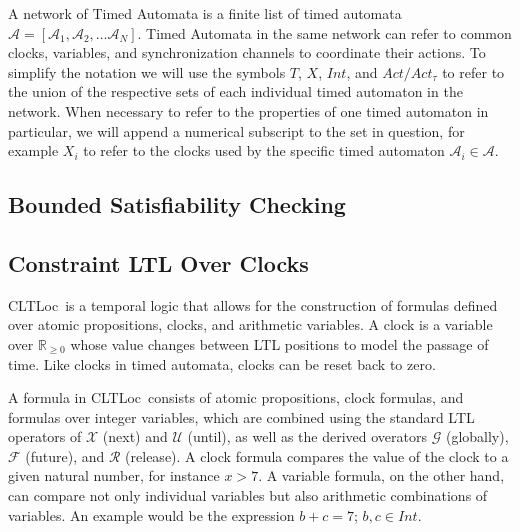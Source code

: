 \documentclass[a4paper,12pt]{article}
\newcommand{\cltloc}{CLTLoc}
\begin{document}
A network of Timed Automata is a finite list of timed automata \(\mathcal{A} =
[\mathcal{A}_1, \mathcal{A}_2, \ldots \mathcal{A}_N]\). Timed Automata in the
same network can refer to common clocks, variables, and synchronization channels
to coordinate their actions. To simplify the notation we will use the symbols
\(T\), \(X\), \(Int\), and \(Act/Act_{\tau}\) to refer to the union of the respective
sets of each individual timed automaton in the network. When necessary to refer
to the properties of one timed automaton in particular, we will append a
numerical subscript to the set in question, for example \(X_i\) to refer to the
clocks used by the specific timed automaton \(\mathcal{A}_{i} \in \mathcal{A}\).

\subsection{Bounded Satisfiability Checking}\label{bounded-sat}


\subsection{Constraint LTL Over Clocks}\label{cltloc}

\cltloc\ is a temporal logic that allows for the construction of formulas
defined over atomic propositions, clocks, and arithmetic variables. A clock is a
variable over \(\mathbb{R}_{\geq 0}\) whose value changes between LTL positions
to model the passage of time. Like clocks in timed automata, clocks can be
reset back to zero.

A formula in \cltloc\ consists of atomic propositions, clock formulas, and
formulas over integer variables, which are combined using the standard LTL
operators of \(\mathcal{X}\) (next) and \(\mathcal{U}\) (until), as well as the
derived overators \(\mathcal{G}\) (globally), \(\mathcal{F}\) (future), and
\(\mathcal{R}\) (release). A clock formula compares the value of the clock to a
given natural number, for instance \(x > 7\). A variable formula, on the other
hand, can compare not only individual variables but also arithmetic combinations
of variables. An example would be the expression \(b + c = 7\); \(b,c \in Int\).
\end{document}
